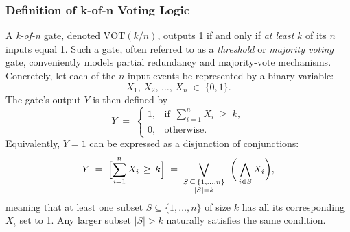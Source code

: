 \subsubsection{Definition of k-of-n Voting Logic}
\label{sec:kn_voting_logic_definition}

A \emph{k-of-n} gate, denoted \(\mathrm{VOT}(k/n)\), outputs 1 if and only if \emph{at least} \(k\) of its \(n\) inputs equal 1. Such a gate, often referred to as a \emph{threshold} or \emph{majority voting} gate, conveniently models partial redundancy and majority-vote mechanisms. Concretely, let each of the \(n\) input events be represented by a binary variable:
\[
X_1, \, X_2, \, \dots, \, X_n \;\in\;\{0,1\}.
\]
The gate’s output \(Y\) is then defined by
\begin{equation}
\label{eq:kn_gate_boolean}
Y 
\;=\;
\begin{cases}
1, & \text{if }\, \displaystyle\sum_{i=1}^{n} X_i \;\ge\; k,\\[4pt]
0, & \text{otherwise}.
\end{cases}
\end{equation}
Equivalently, \(Y=1\) can be expressed as a disjunction of conjunctions:
\begin{equation}
\label{eq:k_of_n_or_of_ands}
Y 
\;=\;
\Bigl[\sum_{i=1}^{n} X_i \,\ge\, k\Bigr]
\;=\;
\bigvee_{\substack{S\,\subseteq\,\{1,\dots,n\}\\|S|=k}}
\;\;\biggl(\,\bigwedge_{i\in S} X_i\biggr),
\end{equation}
meaning that at least one subset \(S\subseteq \{1,\dots,n\}\) of size \(k\) has all its corresponding \(X_i\) set to 1. Any larger subset \(\lvert S\rvert > k\) naturally satisfies the same condition.
